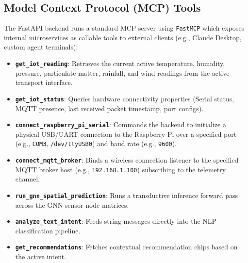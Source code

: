 \documentclass[12pt]{article}
\begin{document}
\subsection{Model Context Protocol (MCP) Tools}
The FastAPI backend runs a standard MCP server using \texttt{FastMCP} which exposes internal microservices as callable tools to external clients (e.g., Claude Desktop, custom agent terminals):
\begin{itemize}
    \item \textbf{\texttt{get\_iot\_reading}}: Retrieves the current active temperature, humidity, pressure, particulate matter, rainfall, and wind readings from the active transport interface.
    \item \textbf{\texttt{get\_iot\_status}}: Queries hardware connectivity properties (Serial status, MQTT presence, last received packet timestamp, port configs).
    \item \textbf{\texttt{connect\_raspberry\_pi\_serial}}: Commands the backend to initialize a physical USB/UART connection to the Raspberry Pi over a specified port (e.g., \texttt{COM3}, \texttt{/dev/ttyUSB0}) and baud rate (e.g., \texttt{9600}).
    \item \textbf{\texttt{connect\_mqtt\_broker}}: Binds a wireless connection listener to the specified MQTT broker host (e.g., \texttt{192.168.1.100}) subscribing to the telemetry channel.
    \item \textbf{\texttt{run\_gnn\_spatial\_prediction}}: Runs a transductive inference forward pass across the GNN sensor node matrices.
    \item \textbf{\texttt{analyze\_text\_intent}}: Feeds string messages directly into the NLP classification pipeline.
    \item \textbf{\texttt{get\_recommendations}}: Fetches contextual recommendation chips based on the active intent.
\end{itemize}
\end{document}
